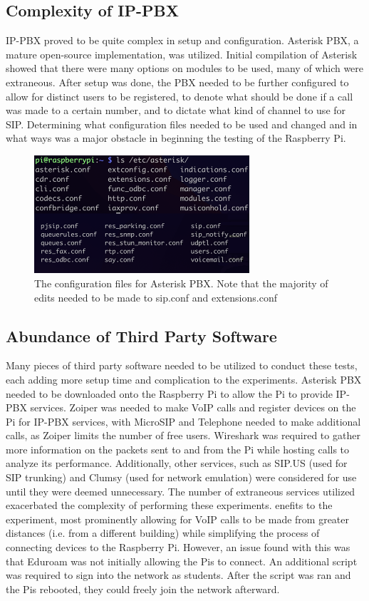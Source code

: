 	\subsection{Complexity of IP-PBX}
	    IP-PBX proved to be quite complex in setup and configuration. Asterisk PBX, a mature open-source implementation, was utilized. Initial compilation of Asterisk showed that there were many options on modules to be used, many of which were extraneous. After setup was done, the PBX needed to be further configured to allow for distinct users to be registered, to denote what should be done if a call was made to a certain number, and to dictate what kind of channel to use for SIP. Determining what configuration files needed to be used and changed and in what ways was a major obstacle in beginning the testing of the Raspberry Pi.
	    
	    \begin{figure}[htbp]
			\centerline{\includegraphics[width=8cm]{Images/experiment/config.png}}
			\caption{The configuration files for Asterisk PBX. Note that the majority of edits needed to be made to sip.conf and extensions.conf}
			\label{fig:conf}
		\end{figure}
		
	\subsection{Abundance of Third Party Software}
	    Many pieces of third party software needed to be utilized to conduct these tests, each adding more setup time and complication to the experiments. Asterisk PBX needed to be downloaded onto the Raspberry Pi to allow the Pi to provide IP-PBX services. Zoiper was needed to make VoIP calls and register devices on the Pi for IP-PBX services, with MicroSIP and Telephone needed to make additional calls, as Zoiper limits the number of free users. Wireshark was required to gather more information on the packets sent to and from the Pi while hosting calls to analyze its performance. Additionally, other services, such as SIP.US (used for SIP trunking) and Clumsy (used for network emulation) were considered for use until they were deemed unnecessary. The number of extraneous services utilized exacerbated the complexity of performing these experiments. enefits to the experiment, most prominently allowing for VoIP calls to be made from greater distances (i.e. from a different building) while simplifying the process of connecting devices to the Raspberry Pi. However, an issue found with this was that Eduroam was not initially allowing the Pis to connect. An additional script was required to sign into the network as students. After the script was ran and the Pis rebooted, they could freely join the network afterward.